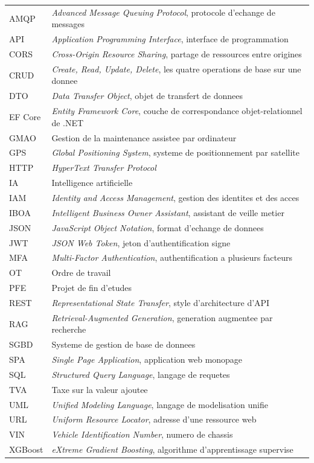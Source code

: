 \begin{longtable}{@{}p{2.6cm}p{11.5cm}@{}}
AMQP    & \textit{Advanced Message Queuing Protocol}, protocole d'echange de messages \\
API     & \textit{Application Programming Interface}, interface de programmation \\
CORS    & \textit{Cross-Origin Resource Sharing}, partage de ressources entre origines \\
CRUD    & \textit{Create, Read, Update, Delete}, les quatre operations de base sur une donnee \\
DTO     & \textit{Data Transfer Object}, objet de transfert de donnees \\
EF Core & \textit{Entity Framework Core}, couche de correspondance objet-relationnel de .NET \\
GMAO    & Gestion de la maintenance assistee par ordinateur \\
GPS     & \textit{Global Positioning System}, systeme de positionnement par satellite \\
HTTP    & \textit{HyperText Transfer Protocol} \\
IA      & Intelligence artificielle \\
IAM     & \textit{Identity and Access Management}, gestion des identites et des acces \\
IBOA    & \textit{Intelligent Business Owner Assistant}, assistant de veille metier \\
JSON    & \textit{JavaScript Object Notation}, format d'echange de donnees \\
JWT     & \textit{JSON Web Token}, jeton d'authentification signe \\
MFA     & \textit{Multi-Factor Authentication}, authentification a plusieurs facteurs \\
OT      & Ordre de travail \\
PFE     & Projet de fin d'etudes \\
REST    & \textit{Representational State Transfer}, style d'architecture d'API \\
RAG     & \textit{Retrieval-Augmented Generation}, generation augmentee par recherche \\
SGBD    & Systeme de gestion de base de donnees \\
SPA     & \textit{Single Page Application}, application web monopage \\
SQL     & \textit{Structured Query Language}, langage de requetes \\
TVA     & Taxe sur la valeur ajoutee \\
UML     & \textit{Unified Modeling Language}, langage de modelisation unifie \\
URL     & \textit{Uniform Resource Locator}, adresse d'une ressource web \\
VIN     & \textit{Vehicle Identification Number}, numero de chassis \\
XGBoost & \textit{eXtreme Gradient Boosting}, algorithme d'apprentissage supervise \\
\bottomrule
\end{longtable}
